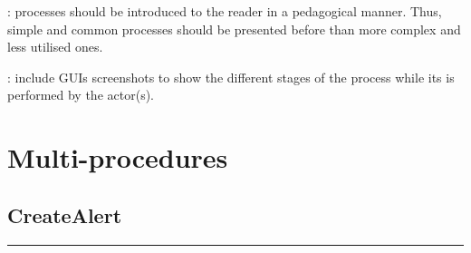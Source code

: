 : processes should be introduced to the
reader in a pedagogical manner. Thus, simple and common processes should be presented before
than more complex and less utilised ones.

: include GUIs screenshots to show the
different stages of the process while its is performed by the actor(s).


\section{Multi-procedures}

\subsection{CreateAlert}
\vspace{0.5cm}
\hrule
